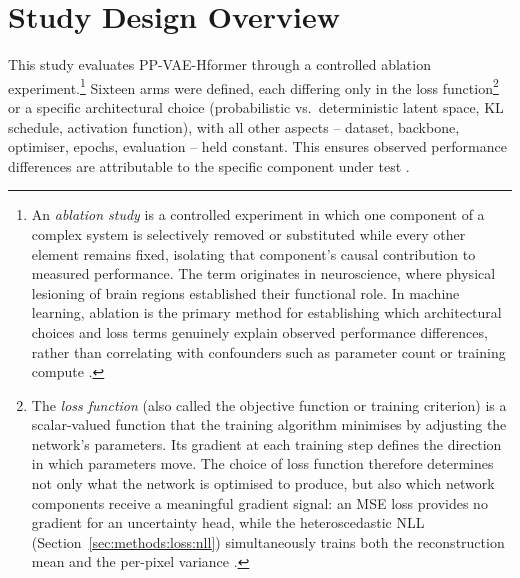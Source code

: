 \documentclass[12pt, a4paper, twoside, openright]{book}
\begin{document}
\section{Study Design Overview}
\label{sec:methods:overview}


This study evaluates PP-VAE-Hformer through a controlled ablation experiment.\footnote{An \emph{ablation study} is a controlled experiment in which one component of a complex system is selectively removed or substituted while every other element remains fixed, isolating that component's causal contribution to measured performance. The term originates in neuroscience, where physical lesioning of brain regions established their functional role. In machine learning, ablation is the primary method for establishing which architectural choices and loss terms genuinely explain observed performance differences, rather than correlating with confounders such as parameter count or training compute \cite{meyes_ablation_2019}.} Sixteen arms were defined, each differing only in the loss function\footnote{The \emph{loss function} (also called the objective function or training criterion) is a scalar-valued function that the training algorithm minimises by adjusting the network's parameters. Its gradient at each training step defines the direction in which parameters move. The choice of loss function therefore determines not only what the network is optimised to produce, but also which network components receive a meaningful gradient signal: an MSE loss provides no gradient for an uncertainty head, while the heteroscedastic NLL (Section~\ref{sec:methods:loss:nll}) simultaneously trains both the reconstruction mean and the per-pixel variance \cite{kendall_what_2017}.} or a specific architectural choice (probabilistic vs.\ deterministic latent space, KL schedule, activation function), with all other aspects -- dataset, backbone, optimiser, epochs, evaluation -- held constant. This ensures observed performance differences are attributable to the specific component under test \cite{zhang_beyond_2017, liang_swinir_2021}.
\end{document}
